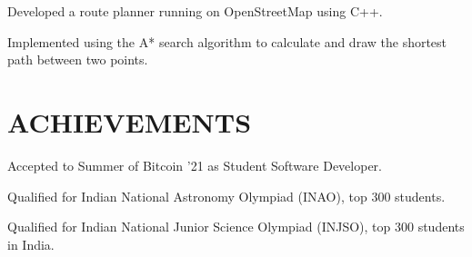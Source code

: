 \documentclass[letterpaper]{deedy-resume} %
\begin{document}
\begin{minipage}[t]{0.66\textwidth}
\sectionspace %



\begin{tightitemize}
\item Developed a route planner running on OpenStreetMap using C++.
\item Implemented using the A* search algorithm to calculate and draw the shortest path between two points.
\end{tightitemize}

\sectionspace %

\section{ACHIEVEMENTS} 

\vspace{\topsep} %
\begin{tightitemize}
\item Accepted to Summer of Bitcoin '21 as Student Software Developer.
\item Qualified for Indian National Astronomy Olympiad (INAO), top 300 students.
\item Qualified for Indian National Junior Science Olympiad (INJSO), top 300 students in India.
\end{tightitemize}



\end{minipage}
\end{document}
